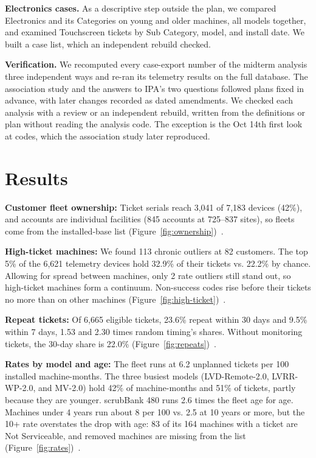\smallskip\noindent\textbf{Electronics cases.}
As a descriptive step outside the plan, we compared Electronics and its Categories on young and older machines, all models together, and examined Touchscreen tickets by Sub Category, model, and install date. We built a case list, which an independent rebuild checked.

\smallskip\noindent\textbf{Verification.}
We recomputed every case-export number of the midterm analysis three independent ways and re-ran its telemetry results on the full database. The association study and the answers to IPA's two questions followed plans fixed in advance, with later changes recorded as dated amendments. We checked each analysis with a review or an independent rebuild, written from the definitions or plan without reading the analysis code. The exception is the Oct 14th first look at codes, which the association study later reproduced.

\section{Results}
\smallskip\noindent\textbf{Customer fleet ownership:}
Ticket serials reach 3,041 of 7,183 devices (42\%), and accounts are individual facilities (845 accounts at 725--837 sites), so fleets come from the installed-base list (Figure~\ref{fig:ownership})~\cite{nb01}.

\smallskip\noindent\textbf{High-ticket machines:}
We found 113 chronic outliers at 82 customers. The top 5\% of the 6,621 telemetry devices hold 32.9\% of their tickets vs. 22.2\% by chance. Allowing for spread between machines, only 2 rate outliers still stand out, so high-ticket machines form a continuum. Non-success codes rise before their tickets no more than on other machines (Figure~\ref{fig:high-ticket})~\cite{nb02}.

\smallskip\noindent\textbf{Repeat tickets:}
Of 6,665 eligible tickets, 23.6\% repeat within 30 days and 9.5\% within 7 days, 1.53 and 2.30 times random timing's shares. Without monitoring tickets, the 30-day share is 22.0\% (Figure~\ref{fig:repeats})~\cite{nb03}.

\smallskip\noindent\textbf{Rates by model and age:}
The fleet runs at 6.2 unplanned tickets per 100 installed machine-months. The three busiest models (LVD-Remote-2.0, LVRR-WP-2.0, and MV-2.0) hold 42\% of machine-months and 51\% of tickets, partly because they are younger. scrubBank 480 runs 2.6 times the fleet age for age. Machines under 4 years run about 8 per 100 vs. 2.5 at 10 years or more, but the 10+ rate overstates the drop with age: 83 of its 164 machines with a ticket are Not Serviceable, and removed machines are missing from the list (Figure~\ref{fig:rates})~\cite{nb04}.

